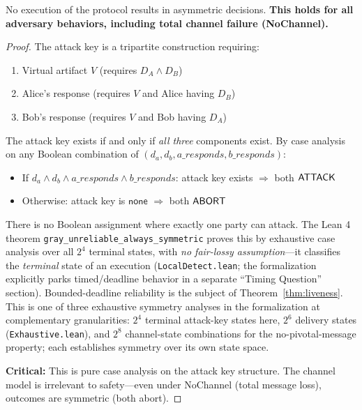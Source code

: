 
\begin{theorem}
\label{thm:safety}
No execution of the protocol results in asymmetric decisions. \textbf{This holds for all adversary behaviors, including total channel failure (NoChannel).}
\end{theorem}

\begin{proof}
The attack key is a tripartite construction requiring:
\begin{enumerate}
    \item Virtual artifact $V$ (requires $D_A \land D_B$)
    \item Alice's response (requires $V$ and Alice having $D_B$)
    \item Bob's response (requires $V$ and Bob having $D_A$)
\end{enumerate}

The attack key exists if and only if \emph{all three} components exist. By case analysis on any Boolean combination of $(d_a, d_b, a\_responds, b\_responds)$:
\begin{itemize}
    \item If $d_a \land d_b \land a\_responds \land b\_responds$: attack key exists $\Rightarrow$ both $\mathsf{ATTACK}$
    \item Otherwise: attack key is $\mathsf{none}$ $\Rightarrow$ both $\mathsf{ABORT}$
\end{itemize}

There is no Boolean assignment where exactly one party can attack. The Lean 4 theorem \texttt{gray\_unreliable\_always\_symmetric} proves this by exhaustive case analysis over all $2^4$ terminal states, with \emph{no fair-lossy assumption}---it classifies the \emph{terminal} state of an execution (\texttt{LocalDetect.lean}; the formalization explicitly parks timed/deadline behavior in a separate ``Timing Question'' section). Bounded-deadline reliability is the subject of Theorem~\ref{thm:liveness}. This is one of three exhaustive symmetry analyses in the formalization at complementary granularities: $2^4$ terminal attack-key states here, $2^6$ delivery states (\texttt{Exhaustive.lean}), and $2^8$ channel-state combinations for the no-pivotal-message property; each establishes symmetry over its own state space.

\textbf{Critical:} This is pure case analysis on the attack key structure. The channel model is irrelevant to safety---even under NoChannel (total message loss), outcomes are symmetric (both abort).
\end{proof}

